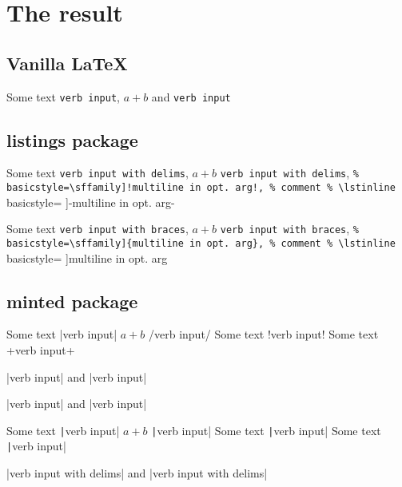 \documentclass[a4paper]{article}
\begin{document}
\section{The result}

\subsection{Vanilla \LaTeX}

Some text \verb|verb input|, %
$a+b$ and \verb*"verb input" %

\subsection{listings package}

Some text \lstinline|verb input with delims|, %
$a+b$ \lstinline[showspaces,basicstyle=\ttfamily]/verb input with delims/, %
%
\lstinline[%
basicstyle=\sffamily]!multiline in opt. arg!, %
%
\lstinline[%
basicstyle=\sffamily
]-multiline in opt. arg- %

Some text \lstinline{verb input with braces}, %
$a+b$ \lstinline[showspaces]{verb input with braces}, %
%
\lstinline[%
basicstyle=\sffamily]{multiline in opt. arg}, %
%
\lstinline[
basicstyle=\sffamily
]{multiline in opt. arg} %

\subsection{minted package}

Some text |verb input| %
$a+b$ /verb input/ %
Some text !verb input! %
Some text +verb input+ %

\text|verb input| and \text[showspaces=false]|verb input| %

\mytext|verb input| and \mytext[%
showspaces=false
]|verb input| %

Some text \texttt|verb input| %
$a+b$ \texttt|verb input| %
Some text \texttt|verb input| %
Some text \texttt|verb input| %

\textinline|verb input with delims| and \textinline[%
showspaces=false
]|verb input with delims| %
\end{document}
